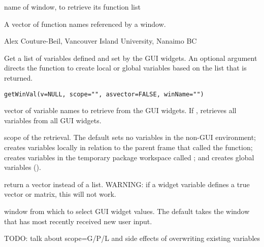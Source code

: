\documentclass[letterpaper]{book}
\begin{document}
%
\begin{Arguments}
\begin{ldescription}
\item[\code{winName}] name of window, to retrieve its function list
\end{ldescription}
\end{Arguments}
%
\begin{Value}
A vector of function names referenced by a window.
\end{Value}
%
\begin{Author}\relax
Alex Couture-Beil, Vancouver Island University, Nanaimo BC
\end{Author}
%
\begin{Description}\relax
Get a list of variables defined and set by the GUI widgets. An optional 
argument  directs the function to create local or global 
variables based on the list that is returned.
\end{Description}
%
\begin{Usage}
\begin{verbatim}
getWinVal(v=NULL, scope="", asvector=FALSE, winName="")
\end{verbatim}
\end{Usage}
%
\begin{Arguments}
\begin{ldescription}
\item[\code{v}] vector of variable names to retrieve from the GUI widgets. 
If ,  retrieves all variables from all GUI widgets.
\item[\code{scope}] scope of the retrieval. The default sets no variables
in the non-GUI environment;  creates variables
locally in relation to the parent frame that called the function;
 creates variables in the temporary package 
workspace called ; and  creates
global variables ().
\item[\code{asvector}] return a vector instead of a list. 
WARNING: if a widget variable defines a true vector or matrix, this will not work.
\item[\code{winName}] window from which to select GUI widget values. The default 
takes the window that has most recently received new user input.
\end{ldescription}
\end{Arguments}
%
\begin{Details}\relax
TODO: talk about scope=G/P/L and side effects of overwriting existing variables
\end{Details}
\end{document}

